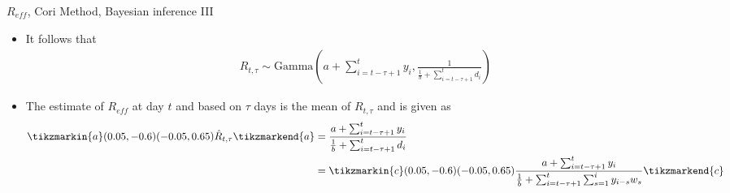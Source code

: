 \documentclass[
  ignorenonframetext,
  aspectratio=169,
]{beamer}
\newcommand{\mli}[1]{\mathit{#1}}%
\begin{document}
\begin{frame}{\(R_\mli{eff}\), Cori Method,
Bayesian inference III}
\protect\hypertarget{r_mlieff-cori-method-bayesian-inference-iii}{}
\begin{itemize}
\item It follows that
\begin{align}
  R_{t,\tau} \sim \text{Gamma}\left(a+\sum_{i=t-\tau+1}^t y_i, \frac{1}{\frac{1}{b} + \sum_{i=t-\tau+1}^t d_i}\right)
\end{align}
\item The estimate of $R_\mli{eff}$ at day $t$ and based on $\tau$ days is the mean of $R_{t,\tau}$ and is given as
\begin{align*}
  \tikzmarkin{a}(0.05,-0.6)(-0.05,0.65)\hat{R}_{t,\tau}\tikzmarkend{a} &= \frac{a+\sum_{i=t-\tau+1}^t y_i}{\frac{1}{b} + \sum_{i=t-\tau+1}^t d_i} \\
  &=\tikzmarkin{c}(0.05,-0.6)(-0.05,0.65) \frac{a+\sum_{i=t-\tau+1}^t y_i}{\frac{1}{b} + \sum_{i=t-\tau+1}^t \sum_{s=1}^i y_{i-s}w_s}\tikzmarkend{c}
\end{align*}
\end{itemize}
\end{frame}
\end{document}
